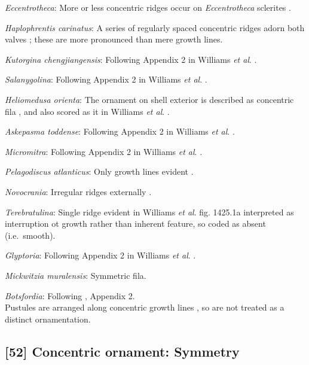 \documentclass[openany]{book}
\theoremstyle{definition}
\theoremstyle{definition}
\theoremstyle{definition}
\theoremstyle{remark}
\begin{document}
\emph{Eccentrotheca}: More or less concentric ridges occur on
\emph{Eccentrotheca} sclerites
\citep{Skovsted2011Scleritomeconstruction}.

\emph{Haplophrentis carinatus}: A series of regularly spaced concentric
ridges adorn both valves \citep{Moysiuk2017Hyolithsare}; these are more
pronounced than mere growth lines.

\emph{Kutorgina chengjiangensis}: Following Appendix 2 in Williams
\emph{et al}. \citeyearpar{Williams1998Thediversity}.

\emph{Salanygolina}: Following Appendix 2 in Williams \emph{et al}.
\citeyearpar{Williams1998Thediversity}.

\emph{Heliomedusa orienta}: The ornament on shell exterior is described
as concentric fila \citep[P.43]{Chen2007Reinterpretationof}, and also
scored as it in Williams \emph{et al}.
\citeyearpar[pp.160--163]{Williams2000BrachiopodaLinguliformea}.

\emph{Askepasma toddense}: Following Appendix 2 in Williams \emph{et
al}. \citeyearpar{Williams1998Thediversity}.

\emph{Micromitra}: Following Appendix 2 in Williams \emph{et al}.
\citeyearpar{Williams1998Thediversity}.

\emph{Pelagodiscus atlanticus}: Only growth lines evident
\citep{Williams2000BrachiopodaLinguliformea}.

\emph{Novocrania}: Irregular ridges externally
\citep{Williams2000BrachiopodaLinguliformea}.

\emph{Terebratulina}: Single ridge evident in Williams \emph{et al}.
\citeyearpar{Williams2006Rhynchonelliformeapart} fig. 1425.1a
interpreted as interruption ot growth rather than inherent feature, so
coded as absent (i.e.~smooth).

\emph{Glyptoria}: Following Appendix 2 in Williams \emph{et al}.
\citeyearpar{Williams1998Thediversity}.

\emph{Mickwitzia muralensis}: Symmetric fila.

\emph{Botsfordia}: Following \citet{Williams1998Thediversity}, Appendix
2.\\
Pustules are arranged along concentric growth lines
\citep{Skovsted2005EarlyCambrian}, so are not treated as a distinct
ornamentation.

\hypertarget{concentric-ornament-symmetry}{%
\subsection*{{[}52{]} Concentric ornament:
Symmetry}\label{concentric-ornament-symmetry}}
\end{document}
